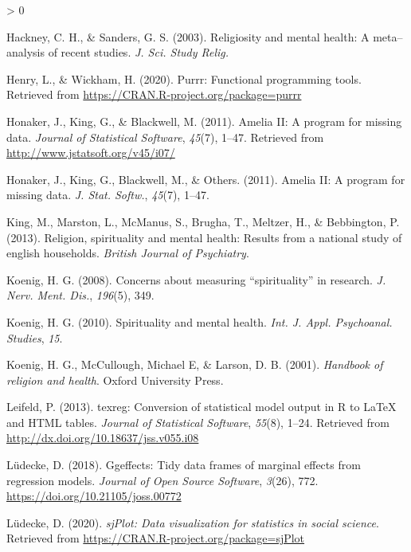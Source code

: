 \documentclass[
  english,
  man,floatsintext]{apa6}
\newlength{\cslhangindent}
\newenvironment{CSLReferences}[2] %
 {%
  \setlength{\parindent}{0pt}
  \ifodd #1 \everypar{\setlength{\hangindent}{\cslhangindent}}\ignorespaces\fi
  \ifnum #2 > 0
  \setlength{\parskip}{#2\baselineskip}
  \fi
 }%
 {}
\begin{document}
\begin{CSLReferences}{1}{0}
\leavevmode\hypertarget{ref-Hackney2003-rs}{}%
Hackney, C. H., \& Sanders, G. S. (2003). Religiosity and mental health: A meta--analysis of recent studies. \emph{J. Sci. Study Relig.}

\leavevmode\hypertarget{ref-R-purrr}{}%
Henry, L., \& Wickham, H. (2020). Purrr: Functional programming tools. Retrieved from \url{https://CRAN.R-project.org/package=purrr}

\leavevmode\hypertarget{ref-R-Amelia}{}%
Honaker, J., King, G., \& Blackwell, M. (2011). {Amelia II}: A program for missing data. \emph{Journal of Statistical Software}, \emph{45}(7), 1--47. Retrieved from \url{http://www.jstatsoft.org/v45/i07/}

\leavevmode\hypertarget{ref-Honaker2011-yu}{}%
Honaker, J., King, G., Blackwell, M., \& Others. (2011). Amelia {II}: A program for missing data. \emph{J. Stat. Softw.}, \emph{45}(7), 1--47.

\leavevmode\hypertarget{ref-King2013-cg}{}%
King, M., Marston, L., McManus, S., Brugha, T., Meltzer, H., \& Bebbington, P. (2013). Religion, spirituality and mental health: Results from a national study of english households. \emph{British Journal of Psychiatry}.

\leavevmode\hypertarget{ref-Koenig2008-lv}{}%
Koenig, H. G. (2008). Concerns about measuring {``spirituality''} in research. \emph{J. Nerv. Ment. Dis.}, \emph{196}(5), 349.

\leavevmode\hypertarget{ref-Koenig2010-gk}{}%
Koenig, H. G. (2010). Spirituality and mental health. \emph{Int. J. Appl. Psychoanal. Studies}, \emph{15}.

\leavevmode\hypertarget{ref-Koenig2001-ow}{}%
Koenig, H. G., McCullough, Michael E, \& Larson, D. B. (2001). \emph{Handbook of religion and health}. Oxford University Press.

\leavevmode\hypertarget{ref-R-texreg}{}%
Leifeld, P. (2013). {texreg}: Conversion of statistical model output in {R} to {LaTeX} and {HTML} tables. \emph{Journal of Statistical Software}, \emph{55}(8), 1--24. Retrieved from \url{http://dx.doi.org/10.18637/jss.v055.i08}

\leavevmode\hypertarget{ref-R-ggeffects}{}%
Lüdecke, D. (2018). Ggeffects: Tidy data frames of marginal effects from regression models. \emph{Journal of Open Source Software}, \emph{3}(26), 772. \url{https://doi.org/10.21105/joss.00772}

\leavevmode\hypertarget{ref-R-sjPlot}{}%
Lüdecke, D. (2020). \emph{sjPlot: Data visualization for statistics in social science}. Retrieved from \url{https://CRAN.R-project.org/package=sjPlot}


\end{CSLReferences}
\end{document}
